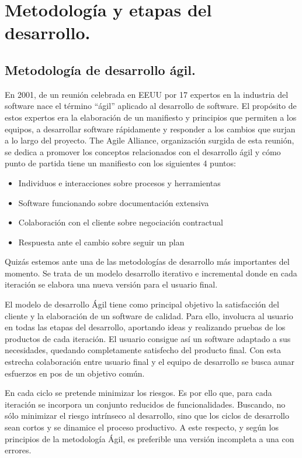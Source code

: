 \section{Metodología y etapas del desarrollo.}

\subsection{Metodología de desarrollo ágil.}

En 2001, de un reunión celebrada en EEUU por 17 expertos en la industria del software nace el término “ágil” aplicado al desarrollo de software. El propósito de estos expertos era la elaboración de un manifiesto y principios que permiten a los equipos, a desarrollar software rápidamente y responder a los cambios que surjan a lo largo del proyecto. The Agile Alliance, organización surgida de esta reunión, se dedica a promover los conceptos relacionados con el desarrollo ágil y cómo punto de partida tiene un manifiesto con los siguientes 4 puntos:

\begin{itemize}
\item Individuos e interacciones sobre procesos y herramientas
\item Software funcionando sobre documentación extensiva
\item Colaboración con el cliente sobre negociación contractual
\item Respuesta ante el cambio sobre seguir un plan
\end{itemize}

Quizás estemos ante una de las metodologías de desarrollo más importantes del momento. Se trata de un modelo desarrollo iterativo e incremental donde en cada iteración se elabora una nueva versión para el  usuario final.

El modelo de desarrollo Ágil tiene como principal objetivo la satisfacción del cliente y la elaboración de un software de calidad. Para ello, involucra al usuario en todas las etapas del desarrollo, aportando ideas y realizando pruebas de los productos de cada iteración. El usuario consigue así un software adaptado a sus necesidades, quedando completamente satisfecho del producto final. Con esta estrecha colaboración entre usuario final y el equipo de desarrollo se busca  aunar esfuerzos en pos de un objetivo común.

En cada ciclo se pretende minimizar los riesgos. Es por ello que, para cada iteración se incorpora un conjunto reducidos de funcionalidades. Buscando, no sólo minimizar el riesgo intrínseco al desarrollo, sino que los ciclos de desarrollo sean cortos y se dinamice el proceso productivo. A este respecto, y según los principios de la metodología Ágil, es preferible una  versión incompleta a una con errores.  

